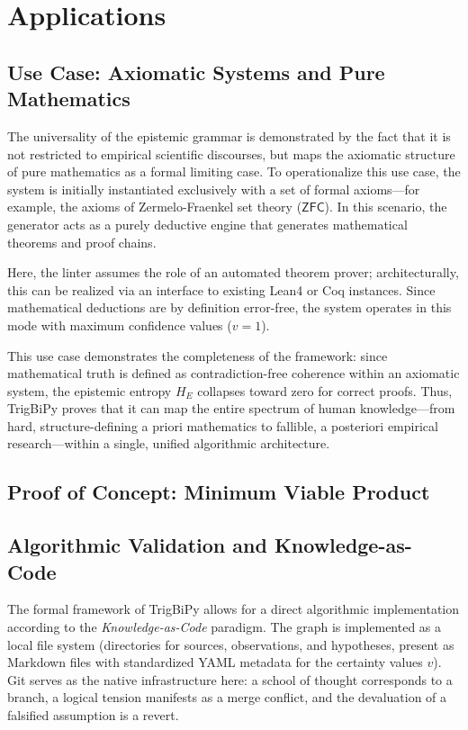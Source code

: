 \documentclass[11pt, a4paper]{article}
\begin{document}
	\section{Applications}
	
	\subsection{Use Case: Axiomatic Systems and Pure Mathematics} \label{math}
	
	The universality of the epistemic grammar is demonstrated by the fact that it is not restricted to empirical scientific discourses, but maps the axiomatic structure of pure mathematics as a formal limiting case. To operationalize this use case, the system is initially instantiated exclusively with a set of formal axioms—for example, the axioms of Zermelo-Fraenkel set theory ($\mathsf{ZFC}$). In this scenario, the generator acts as a purely deductive engine that generates mathematical theorems and proof chains.
	
	Here, the linter assumes the role of an automated theorem prover; architecturally, this can be realized via an interface to existing Lean4 or Coq instances. Since mathematical deductions are by definition error-free, the system operates in this mode with maximum confidence values ($v = 1$). 
	
	This use case demonstrates the completeness of the framework: since mathematical truth is defined as contradiction-free coherence within an axiomatic system, the epistemic entropy $H_E$ collapses toward zero for correct proofs. Thus, TrigBiPy proves that it can map the entire spectrum of human knowledge—from hard, structure-defining a priori mathematics to fallible, a posteriori empirical research—within a single, unified algorithmic architecture.
	
	
	\subsection{Proof of Concept: Minimum Viable Product}
	
	
	
	\subsection{Algorithmic Validation and Knowledge-as-Code}
	The formal framework of TrigBiPy allows for a direct algorithmic implementation according to the \emph{Knowledge-as-Code} paradigm. The graph is implemented as a local file system (directories for sources, observations, and hypotheses, present as Markdown files with standardized YAML metadata for the certainty values $v$). Git serves as the native infrastructure here: a school of thought corresponds to a branch, a logical tension manifests as a merge conflict, and the devaluation of a falsified assumption is a revert.
	
\end{document}
